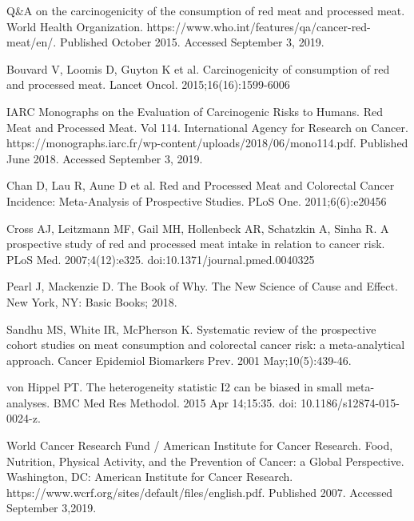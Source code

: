 \documentclass{article}
\begin{document}
\begin{thebibliography}{1}

Q\&A on the carcinogenicity of the consumption of red meat and processed meat. World Health Organization. https://www.who.int/features/qa/cancer-red-meat/en/. Published October 2015. Accessed September 3, 2019.

Bouvard V, Loomis D, Guyton K et al. Carcinogenicity of consumption of red and processed meat. Lancet Oncol. 2015;16(16):1599-6006

IARC Monographs on the Evaluation of Carcinogenic Risks to Humans. Red Meat and Processed Meat. Vol 114. International Agency for Research on Cancer. https://monographs.iarc.fr/wp-content/uploads/2018/06/mono114.pdf. Published June 2018. Accessed September 3, 2019.

Chan D, Lau R, Aune D et al. Red and Processed Meat and Colorectal Cancer Incidence: Meta-Analysis of Prospective Studies. PLoS One. 2011;6(6):e20456

Cross AJ, Leitzmann MF, Gail MH, Hollenbeck AR, Schatzkin A, Sinha R. A prospective study of red and processed meat intake in relation to cancer risk. PLoS Med. 2007;4(12):e325. doi:10.1371/journal.pmed.0040325

Pearl J, Mackenzie D. The Book of Why. The New Science of Cause and Effect. New York, NY: Basic Books; 2018.

Sandhu MS, White IR, McPherson K. Systematic review of the prospective cohort studies on meat consumption and colorectal cancer risk: a meta-analytical approach. Cancer Epidemiol Biomarkers Prev. 2001 May;10(5):439-46.

von Hippel PT. The heterogeneity statistic I2 can be biased in small meta-analyses. BMC Med Res Methodol. 2015 Apr 14;15:35. doi: 10.1186/s12874-015-0024-z.

World Cancer Research Fund / American Institute for Cancer Research.
Food, Nutrition, Physical Activity, and the Prevention of Cancer: a Global
Perspective. Washington, DC: American Institute for Cancer Research. https://www.wcrf.org/sites/default/files/english.pdf. Published 2007. Accessed September 3,2019.


\end{thebibliography}
\end{document}

